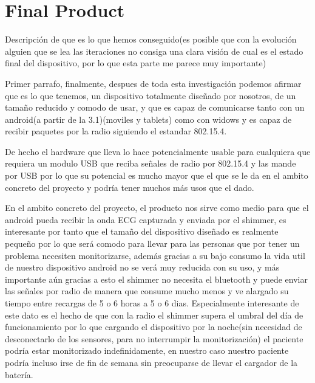 
		\section{Final Product}
		Descripción de que es lo que hemos conseguido(es posible que con la evolución alguien que se lea las iteraciones no consiga una clara visión de cual es el estado final del dispositivo, por lo que esta parte me parece muy importante)
		
		Primer parrafo, finalmente, despues de toda esta investigación podemos afirmar que es lo que tenemos, un dispositivo totalmente diseñado por nosotros, de un tamaño reducido y comodo de usar, y que es capaz de comunicarse tanto con un android(a partir de la 3.1)(moviles y tablets) como con widows y es capaz de recibir paquetes por la radio siguiendo el estandar 802.15.4. 

		De hecho el hardware que lleva lo hace potencialmente usable para cualquiera que requiera un modulo USB que reciba señales de radio por 802.15.4 y las mande por USB por lo que su potencial es mucho mayor que el que se le da en el ambito concreto del proyecto y podría tener muchos más usos que el dado.

		En el ambito concreto del proyecto, el producto nos sirve como medio para que el android pueda recibir la onda ECG capturada y enviada por el shimmer, es interesante por tanto que el tamaño del dispositivo diseñado es realmente pequeño por lo que será comodo para llevar para las personas que por tener un problema necesiten monitorizarse, además gracias a su bajo consumo la vida util de nuestro dispositivo android no se verá muy reducida con su uso, y más importante aún  gracias a esto el shimmer no necesita el bluetooth y puede enviar las señales por radio de manera que consume mucho menos y ve alargado su tiempo entre recargas de 5 o 6 horas a 5 o 6 dias. Especialmente interesante de este dato es el hecho de que con la radio el shimmer supera el umbral del día de funcionamiento por lo que cargando el dispositivo por la noche(sin necesidad de desconectarlo de los sensores, para no interrumpir la monitorización) el paciente podría estar monitorizado indefinidamente, en nuestro caso nuestro paciente podría incluso irse de fin de semana sin preocuparse de llevar el cargador de la batería.

